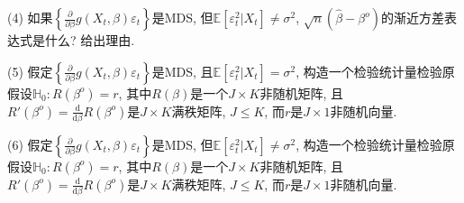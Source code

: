 \documentclass[cn,12pt,math=mtpro2,citestyle=gb7714-2015,bibstyle=gb7714-2015,twocol,mode=simple]{elegantbook}
\newcommand{\HH}{\mathbb{H}}
\newcommand{\E}{\mathbb{E}}
\newcommand{\dd}{\text{d}}
\begin{document}
  (4) 如果$\displaystyle\left\{\frac{\partial}{\partial\beta}g(X_t,\beta)\varepsilon_t\right\}$是MDS, 但$\E[\varepsilon_t^2|X_t]\neq\sigma^2$, $\sqrt{n}(\hat{\beta}-\beta^o)$的渐近方差表达式是什么? 给出理由.

  (5) 假定$\displaystyle\left\{\frac{\partial}{\partial\beta}g(X_t,\beta)\varepsilon_t\right\}$是MDS, 且$\E[\varepsilon_t^2|X_t]=\sigma^2$, 构造一个检验统计量检验原假设$\HH_0:R(\beta^o)=r$, 其中$R(\beta)$是一个$J\times K$非随机矩阵, 且$\displaystyle R'(\beta^o)=\frac{\dd }{\dd\beta}R(\beta^o)$是$J\times K$满秩矩阵, $J\leq K$, 而$r$是$J\times 1$非随机向量.

  (6) 假定$\displaystyle\left\{\frac{\partial}{\partial\beta}g(X_t,\beta)\varepsilon_t\right\}$是MDS, 但$\E[\varepsilon_t^2|X_t]\neq\sigma^2$, 构造一个检验统计量检验原假设$\HH_0:R(\beta^o)=r$, 其中$R(\beta)$是一个$J\times K$非随机矩阵, 且$\displaystyle R'(\beta^o)=\frac{\dd }{\dd\beta}R(\beta^o)$是$J\times K$满秩矩阵, $J\leq K$, 而$r$是$J\times 1$非随机向量.
\end{document}
